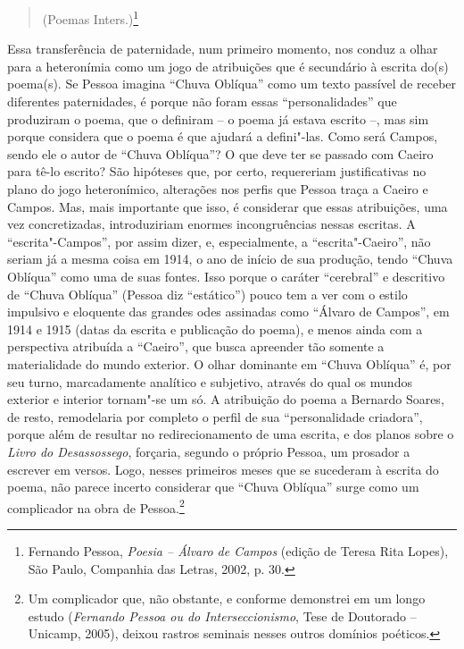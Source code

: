 \begin{quote}
(Poemas Inters.)\footnote{Fernando Pessoa, \emph{Poesia -- Álvaro de
  Campos} (edição de Teresa Rita Lopes), São Paulo, Companhia das
  Letras, 2002, p. 30.}
\end{quote}

Essa transferência de paternidade, num primeiro momento, nos conduz a
olhar para a heteronímia como um jogo de atribuições que é secundário à
escrita do(s) poema(s). Se Pessoa imagina ``Chuva Oblíqua'' como um
texto passível de receber diferentes paternidades, é porque não foram
essas ``personalidades'' que produziram o poema, que o definiram -- o
poema já estava escrito --, mas sim porque considera que o poema é que
ajudará a defini"-las. Como será Campos, sendo ele o autor de ``Chuva
Oblíqua''? O que deve ter se passado com Caeiro para tê-lo escrito? São
hipóteses que, por certo, requereriam justificativas no plano do jogo
heteronímico, alterações nos perfis que Pessoa traça a Caeiro e Campos.
Mas, mais importante que isso, é considerar que essas atribuições, uma
vez concretizadas, introduziriam enormes incongruências nessas escritas.
A ``escrita"-Campos'', por assim dizer, e, especialmente, a
``escrita"-Caeiro'', não seriam já a mesma coisa em 1914, o ano de início
de sua produção, tendo ``Chuva Oblíqua'' como uma de suas fontes. Isso
porque o caráter ``cerebral'' e descritivo de ``Chuva Oblíqua'' (Pessoa
diz ``estático'') pouco tem a ver com o estilo impulsivo e eloquente das
grandes odes assinadas como ``Álvaro de Campos'', em 1914 e 1915 (datas
da escrita e publicação do poema), e menos ainda com a perspectiva
atribuída a ``Caeiro'', que busca apreender tão somente a materialidade
do mundo exterior. O olhar dominante em ``Chuva Oblíqua'' é, por seu
turno, marcadamente analítico e subjetivo, através do qual os mundos
exterior e interior tornam"-se um só. A atribuição do poema a Bernardo
Soares, de resto, remodelaria por completo o perfil de sua
``personalidade criadora'', porque além de resultar no redirecionamento
de uma escrita, e dos planos sobre o \emph{Livro do Desassossego},
forçaria, segundo o próprio Pessoa, um prosador a escrever em versos.
Logo, nesses primeiros meses que se sucederam à escrita do poema, não
parece incerto considerar que ``Chuva Oblíqua'' surge como um
complicador na obra de Pessoa.\footnote{Um complicador que, não
  obstante, e conforme demonstrei em um longo estudo (\emph{Fernando
  Pessoa ou do Interseccionismo}, Tese de Doutorado -- Unicamp, 2005),
  deixou rastros seminais nesses outros domínios poéticos.}

